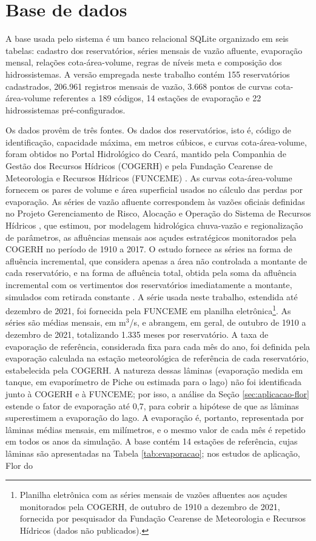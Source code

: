 \section{Base de dados}
\label{sec:base-dados}

A base usada pelo sistema é um banco relacional SQLite \cite{sqlite} organizado em seis tabelas: cadastro dos reservatórios, séries mensais de vazão afluente, evaporação mensal, relações cota-área-volume, regras de níveis meta e composição dos hidrossistemas. A versão empregada neste trabalho contém 155 reservatórios cadastrados, 206.961 registros mensais de vazão, 3.668 pontos de curvas cota-área-volume referentes a 189 códigos, 14 estações de evaporação e 22 hidrossistemas pré-configurados.

Os dados provêm de três fontes. Os dados dos reservatórios, isto é, código de identificação, capacidade máxima, em metros cúbicos, e curvas cota-área-volume, foram obtidos no Portal Hidrológico do Ceará, mantido pela Companhia de Gestão dos Recursos Hídricos (COGERH) e pela Fundação Cearense de Meteorologia e Recursos Hídricos (FUNCEME) \cite{portalHidrologico}. As curvas cota-área-volume fornecem os pares de volume e área superficial usados no cálculo das perdas por evaporação. As séries de vazão afluente correspondem às vazões oficiais definidas no Projeto Gerenciamento de Risco, Alocação e Operação do Sistema de Recursos Hídricos \cite{ceara2021aloca}, que estimou, por modelagem hidrológica chuva-vazão e regionalização de parâmetros, as afluências mensais aos açudes estratégicos monitorados pela COGERH no período de 1910 a 2017. O estudo fornece as séries na forma de afluência incremental, que considera apenas a área não controlada a montante de cada reservatório, e na forma de afluência total, obtida pela soma da afluência incremental com os vertimentos dos reservatórios imediatamente a montante, simulados com retirada constante \cite{ceara2021aloca}. A série usada neste trabalho, estendida até dezembro de 2021, foi fornecida pela FUNCEME em planilha eletrônica\footnote{Planilha eletrônica com as séries mensais de vazões afluentes aos açudes monitorados pela COGERH, de outubro de 1910 a dezembro de 2021, fornecida por pesquisador da Fundação Cearense de Meteorologia e Recursos Hídricos (dados não publicados).}. As séries são médias mensais, em m$^3$/s, e abrangem, em geral, de outubro de 1910 a dezembro de 2021, totalizando 1.335 meses por reservatório. A taxa de evaporação de referência, considerada fixa para cada mês do ano, foi definida pela evaporação calculada na estação meteorológica de referência de cada reservatório, estabelecida pela COGERH. A natureza dessas lâminas (evaporação medida em tanque, em evaporímetro de Piche ou estimada para o lago) não foi identificada junto à COGERH e à FUNCEME; por isso, a análise da Seção \ref{sec:aplicacao-flor} estende o fator de evaporação até 0,7, para cobrir a hipótese de que as lâminas superestimem a evaporação do lago. A evaporação é, portanto, representada por lâminas médias mensais, em milímetros, e o mesmo valor de cada mês é repetido em todos os anos da simulação. A base contém 14 estações de referência, cujas lâminas são apresentadas na Tabela \ref{tab:evaporacao}; nos estudos de aplicação, Flor do 